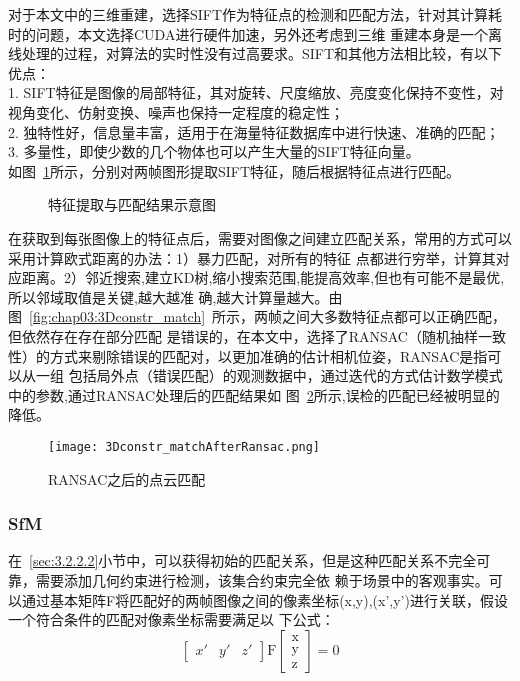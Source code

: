 对于本文中的三维重建，选择SIFT作为特征点的检测和匹配方法，针对其计算耗时的问题，本文选择CUDA进行硬件加速，另外还考虑到三维
重建本身是一个离线处理的过程，对算法的实时性没有过高要求。SIFT和其他方法相比较，有以下优点：\\
1. SIFT特征是图像的局部特征，其对旋转、尺度缩放、亮度变化保持不变性，对视角变化、仿射变换、噪声也保持一定程度的稳定性；\\
2. 独特性好，信息量丰富，适用于在海量特征数据库中进行快速、准确的匹配；\\
3. 多量性，即使少数的几个物体也可以产生大量的SIFT特征向量。\\
如图~\ref{fig:3Dconstrmatchresult}所示，分别对两帧图形提取SIFT特征，随后根据特征点进行匹配。
\begin{figure}[H]
    \centering
    \vskip0.5cm
    \caption{特征提取与匹配结果示意图}\label{fig:3Dconstrmatchresult}
  \end{figure}
在获取到每张图像上的特征点后，需要对图像之间建立匹配关系，常用的方式可以采用计算欧式距离的办法：1）暴力匹配，对所有的特征
点都进行穷举，计算其对应距离。2）邻近搜索,建立KD树,缩小搜索范围,能提高效率,但也有可能不是最优,所以邻域取值是关键,越大越准
确,越大计算量越大。由图~\ref{fig:chap03:3Dconstr_match}~所示，两帧之间大多数特征点都可以正确匹配，但依然存在存在部分匹配
是错误的，在本文中，选择了RANSAC（随机抽样一致性）的方式来剔除错误的匹配对，以更加准确的估计相机位姿，RANSAC是指可以从一组
包括局外点（错误匹配）的观测数据中，通过迭代的方式估计数学模式中的参数,通过RANSAC处理后的匹配结果如
图~\ref{fig:3Dconstr_matchAfterRansac}所示,误检的匹配已经被明显的降低。
\begin{figure}[H] %
  \centering
  \texttt{[image: 3Dconstr\_matchAfterRansac.png]}
  \caption{RANSAC之后的点云匹配}
  \label{fig:3Dconstr_matchAfterRansac}
  \end{figure}
\subsubsection{SfM} 
\label{sec:3.2.2.3}
在~\ref{sec:3.2.2.2}小节中，可以获得初始的匹配关系，但是这种匹配关系不完全可靠，需要添加几何约束进行检测，该集合约束完全依
赖于场景中的客观事实。可以通过基本矩阵F将匹配好的两帧图像之间的像素坐标(x,y),(x',y')进行关联，假设一个符合条件的匹配对像素坐标需要满足以
下公式：
\begin{equation}
\begin{bmatrix}x'&y'&z'\end{bmatrix}\mathrm F\begin{bmatrix}\mathrm x\\\mathrm y\\\mathrm z\end{bmatrix}=0
\end{equation}

